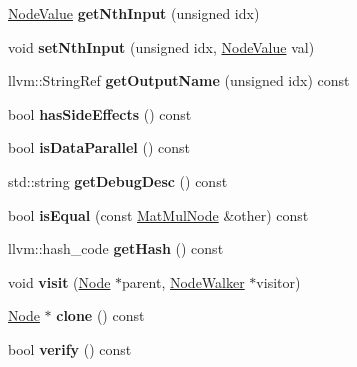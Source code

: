 \begin{DoxyCompactItemize}
\mbox{\label{classglow_1_1_mat_mul_node_ae714a91dcc897cec14ddfdb0d8cbefab}} 
\hyperlink{structglow_1_1_node_value}{Node\+Value} {\bfseries get\+Nth\+Input} (unsigned idx)
\item 
\mbox{\label{classglow_1_1_mat_mul_node_ae1e8e707beabb97e1272c54ca98a7a89}} 
void {\bfseries set\+Nth\+Input} (unsigned idx, \hyperlink{structglow_1_1_node_value}{Node\+Value} val)
\item 
\mbox{\label{classglow_1_1_mat_mul_node_a18ab87a923d7555d59b89d5eede5d776}} 
llvm\+::\+String\+Ref {\bfseries get\+Output\+Name} (unsigned idx) const
\item 
\mbox{\label{classglow_1_1_mat_mul_node_a150a733d4bf80bdfb6a68deb5b7607e9}} 
bool {\bfseries has\+Side\+Effects} () const
\item 
\mbox{\label{classglow_1_1_mat_mul_node_a7490de2d913742587e2d5f8cca87c896}} 
bool {\bfseries is\+Data\+Parallel} () const
\item 
\mbox{\label{classglow_1_1_mat_mul_node_ac7529b62c28683dd80f26942af5eb9fd}} 
std\+::string {\bfseries get\+Debug\+Desc} () const
\item 
\mbox{\label{classglow_1_1_mat_mul_node_aa7c0f843d366ad6644a2fae6ed0810a0}} 
bool {\bfseries is\+Equal} (const \hyperlink{classglow_1_1_mat_mul_node}{Mat\+Mul\+Node} \&other) const
\item 
\mbox{\label{classglow_1_1_mat_mul_node_a9e19e572770e100f433f5d605b46960d}} 
llvm\+::hash\+\_\+code {\bfseries get\+Hash} () const
\item 
\mbox{\label{classglow_1_1_mat_mul_node_a51520c94717f67a9df1f10f18a00d7be}} 
void {\bfseries visit} (\hyperlink{classglow_1_1_node}{Node} $\ast$parent, \hyperlink{classglow_1_1_node_walker}{Node\+Walker} $\ast$visitor)
\item 
\mbox{\label{classglow_1_1_mat_mul_node_a8befe656be8a83cbc75e340a45ed6a1d}} 
\hyperlink{classglow_1_1_node}{Node} $\ast$ {\bfseries clone} () const
\item 
\mbox{\label{classglow_1_1_mat_mul_node_a2778125e5740be0476cce1ef5f584619}} 
bool {\bfseries verify} () const
\end{DoxyCompactItemize}

